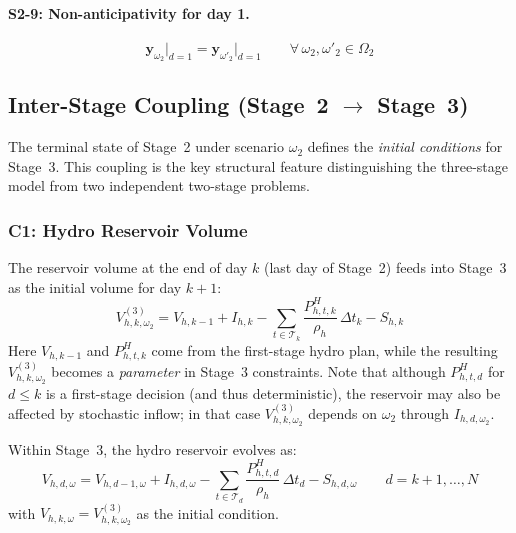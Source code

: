 \documentclass[11pt]{article}
\begin{document}
\paragraph{S2-9: Non-anticipativity for day 1.}
\begin{equation}\label{eq:s2-nonantic}
  \mathbf{y}_{\omega_2}\big|_{d=1}
  = \mathbf{y}_{\omega'_2}\big|_{d=1}
  \qquad \forall\, \omega_2, \omega'_2 \in \Omega_2
\end{equation}

\subsection{Inter-Stage Coupling (Stage~2 $\to$ Stage~3)}
\label{sec:coupling}

The terminal state of Stage~2 under scenario $\omega_2$ defines the
\emph{initial conditions} for Stage~3. This coupling is the key
structural feature distinguishing the three-stage model from two
independent two-stage problems.

\subsubsection{C1: Hydro Reservoir Volume}

The reservoir volume at the end of day $k$ (last day of Stage~2) feeds
into Stage~3 as the initial volume for day $k{+}1$:
\begin{equation}\label{eq:couple-hydro}
\boxed{
  V^{(3)}_{h,k,\omega_2}
  = V_{h,k-1}
  + I_{h,k}
  - \sum_{t \in \mathcal{T}_k}
    \frac{P^{H}_{h,t,k}}{\rho_h}\,\Delta t_k
  - S_{h,k}
}
\end{equation}
Here $V_{h,k-1}$ and $P^{H}_{h,t,k}$ come from the first-stage
hydro plan, while the resulting $V^{(3)}_{h,k,\omega_2}$ becomes a
\emph{parameter} in Stage~3 constraints. Note that although
$P^{H}_{h,t,d}$ for $d \leq k$ is a first-stage decision (and thus
deterministic), the reservoir may also be affected by stochastic inflow;
in that case $V^{(3)}_{h,k,\omega_2}$ depends on $\omega_2$ through
$I_{h,d,\omega_2}$.

Within Stage~3, the hydro reservoir evolves as:
\begin{equation}\label{eq:s3-hydro-wl}
  V_{h,d,\omega} = V_{h,d-1,\omega}
  + I_{h,d,\omega}
  - \sum_{t \in \mathcal{T}_d}
  \frac{P^{H}_{h,t,d}}{\rho_h}\,\Delta t_d
  - S_{h,d,\omega}
  \qquad d = k{+}1,\ldots,N
\end{equation}
with $V_{h,k,\omega} = V^{(3)}_{h,k,\omega_2}$ as the initial condition.
\end{document}
